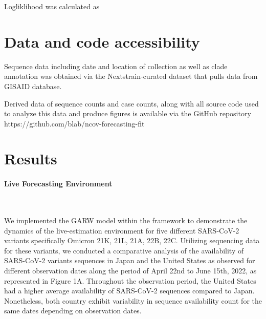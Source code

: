 \documentclass[11pt,oneside,letterpaper]{article}
\begin{document}
Logliklihood was calculated as






\section*{Data and code accessibility}

Sequence data including date and location of collection as well as clade annotation was obtained via the Nextstrain-curated
dataset that pulls data from GISAID database. 



Derived data of sequence counts and case counts, along with all source code used to analyze
this data and produce figures is available via the GitHub repository https://github.com/blab/ncov-forecasting-fit





\section*{Results} 


\paragraph{Live Forecasting Environment}\

We implemented the GARW model within the framework to demonstrate the dynamics of the live-estimation environment for five different SARS-CoV-2 variants specifically Omicron 21K, 21L, 21A, 22B, 22C. 
Utilizing sequencing data for these variants, we conducted a comparative analysis of the availability of SARS-CoV-2 variants sequences in Japan and the United States as observed for different observation dates along the period of April 22nd to June 15th, 2022, as represented in Figure 1A.
Throughout the observation period, the United States had a higher average availability of SARS-CoV-2 sequences compared to Japan. 
Nonetheless, both country exhibit variability in sequence availability count for the same dates depending on observation dates. 
\end{document}
